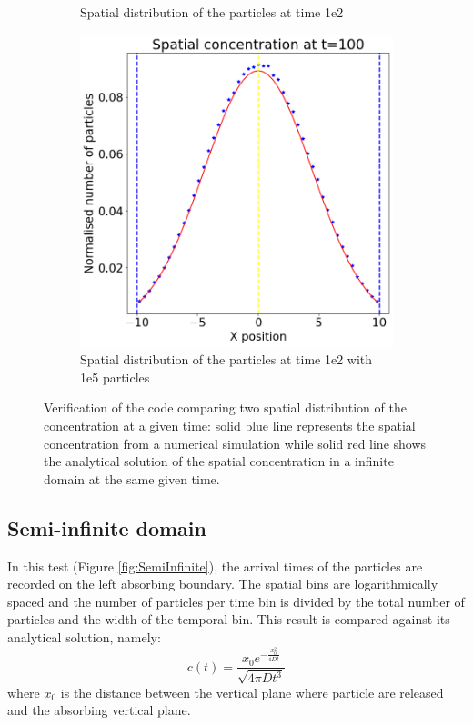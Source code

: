 \documentclass{article}
\begin{document}
\begin{figure}[htbp]
\begin{subfigure}[b]{0.3\textwidth}
        \caption{Spatial distribution of the particles at time 1e2}
        \label{fig:subplotVerInf}
    \end{subfigure}
    \hfill
    \begin{subfigure}[b]{0.3\textwidth}
        \centering
        \includegraphics[width=\textwidth]{images/verificationInfinite1e6.png} %
        \caption{Spatial distribution of the particles at time 1e2 with 1e5 particles}
        \label{fig:subplotVerInf1e5}
    \end{subfigure}
    \caption{Verification of the code comparing two spatial distribution of the concentration at a given time: solid blue line represents the spatial concentration from a numerical simulation while solid red line shows the analytical solution of the spatial concentration in a infinite domain at the same given time.}
    \label{fig:Infinite}
\end{figure}

\subsection{Semi-infinite domain}
In this test (Figure \ref{fig:SemiInfinite}), the arrival times of the particles are recorded on the left absorbing boundary. The spatial bins are logarithmically spaced and the number of particles per time bin is divided by the total number of particles and the width of the temporal bin. This result is compared against its analytical solution, namely:
\begin{equation}
        c(t) = \frac{x_0 e^{-\frac{x_0^2}{4 D t}}}{\sqrt{4 \pi D t^3}}
        \label{eq:SemiInfConc}
\end{equation}
where $x_0$ is the distance between the vertical plane where particle are released and the absorbing vertical plane.
\end{document}
